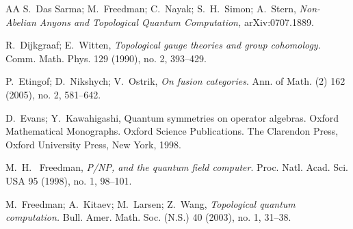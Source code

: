 \documentclass[12pt,psamsfonts]{amsart}
\numberwithin{equation}{section}
\theoremstyle{definition}
\begin{document}
\begin{thebibliography}{AA}
S.\ Das Sarma; M.\ Freedman; C.\ Nayak; S.\ H.\ Simon; A.\ Stern,
\emph{Non-Abelian Anyons and Topological Quantum Computation,}
arXiv:0707.1889.


R.\ Dijkgraaf; E.\ Witten, \emph{Topological gauge theories and group cohomology.}
 Comm. Math. Phys. 129 (1990), no. 2, 393--429.



P.\ Etingof; D.\ Nikshych; V.\ Ostrik,  \emph{On fusion
categories}. Ann. of Math. (2) 162 (2005), no. 2, 581--642.


D.\ Evans; Y.\ Kawahigashi, Quantum symmetries on operator algebras.
Oxford Mathematical Monographs. Oxford Science Publications.
The Clarendon Press, Oxford University Press, New York, 1998.

M.\ H. \ Freedman, \emph{P/NP, and the quantum field computer}.
Proc. Natl. Acad. Sci. USA 95 (1998), no. 1, 98--101.




M.\ Freedman; A.\ Kitaev; M.\ Larsen; Z.\ Wang,
\emph{Topological quantum computation.}
Bull. Amer. Math. Soc.
(N.S.) 40 (2003), no. 1, 31--38.


\end{thebibliography}
\end{document}
